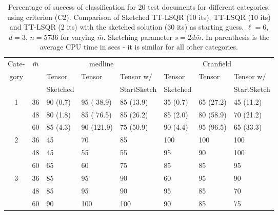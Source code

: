 \documentclass{siamart190516}
\begin{document}
\begin{table}
\centering\footnotesize
\begin{tabular}{|c|c|l|l|l|l|l|l|}
\hline
Cate- & $\bar m$ &\multicolumn{3}{c|}{\sc medline}  &\multicolumn{3}{c|}{\sc Cranfield} \\
gory &  & {Tensor}& {Tensor} & Tensor w/& {Tensor}& {Tensor} & Tensor w/\\
 &  &   Sketched  & & StartSketch&   Sketched  & & StartSketch\\
\hline
1 & 36 &  90 (0.7) &95 (\,\,38.9) & 85 (13.9)& 35 (0.7)& 65 (27.2)& 45 (11.2)\\
  & 48 & 80 (1.8) & 85 (\,\,76.5) &85 (26.2)& 85 (2.0) &80 (58.9)& 70 (21.2)\\
  & 60 & 85 (4.3) & 90 (121.9)& 75 (50.9)& 90 (4.4) &95 (96.5) &  65 (33.3)\\
\hline
2 & 36 &  45  &70  & 85  &100 & 100& 100 \\
  & 48 & 45  & 55  & 55 & 95 & 90 & 100 \\
  & 60 & 65  & 60  & 75  &85  & 85& 95 \\
  \hline
3 & 36 & 85   & 95  & 90& 60 & 95  & 90 \\
  & 48 & 85 & 95  &90 & 95 &85  & 70 \\
  & 60 & 90  & 100  &100  &90  & 85 & 75 \\
  \hline
    \end{tabular}
    \caption{Percentage of success of classification for 20 test documents for different categories, using
    criterion (C2). Comparison
    of Sketched TT-LSQR (10 its), TT-LSQR (10 its) and  TT-LSQR (2 its) with the sketched solution (30 its)
    as starting guess. $\ell=6$, $d=3$, $n=5736$ for varying $\bar m$. Sketching parameter 
    $s=2 d \bar m$. In parenthesis is the average CPU time in secs - it is similar
    for all other categories. \label{tab:sketch}}
\end{table}
\end{document}
